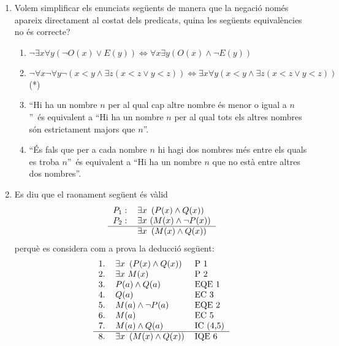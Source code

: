 \begin{enumerate}
\item Volem simplificar els enunciats seg\"{u}ents de manera que la
negaci\'{o} nom\'{e}s apareix directament al costat dels predicats, quina les
seg\"{u}ents equival\`{e}ncies no \'{e}s correcte?

\begin{enumerate}
\item $\lnot\exists x\forall y(\lnot O(x)\vee E(y))\Longleftrightarrow\forall
x\exists y(O(x)\wedge\lnot E(y))$

\item $\lnot\forall x\lnot\forall y\lnot(x<y\wedge\exists z(x<z\vee
y<z))\Longleftrightarrow\exists x\forall y(x<y\wedge\exists z(x<z\vee y<z)) $ (*)

\item \textquotedblleft Hi ha un nombre $n$ per al qual cap altre nombre
\'{e}s menor o igual a $n$\textquotedblright\ \'{e}s equivalent a
\textquotedblleft Hi ha un nombre $n$ per al qual tots els altres nombres
s\'{o}n estrictament majors que $n$\textquotedblright.

\item \textquotedblleft\'{E}s fals que per a cada nombre $n$ hi hagi dos
nombres m\'{e}s entre els quals es troba $n$\textquotedblright\ \'{e}s
equivalent a \textquotedblleft Hi ha un nombre $n$ que no est\`{a} entre
altres dos nombres\textquotedblright.
\end{enumerate}

\item Es diu que el raonament seg\"{u}ent \'{e}s v\`{a}lid%
\[%
\begin{tabular}
[c]{ll}%
$P_{1}:$ & $\exists x~\left(  P(x)\wedge Q(x)\right)  $\\
$P_{2}:$ & $\exists x$ $\left(  M(x)\wedge\lnot P(x)\right)  $\\\hline
& $\exists x~\left(  M(x)\wedge Q(x)\right)  $%
\end{tabular}
\]
perqu\`{e} es considera com a prova la deducci\'{o} seg\"{u}ent:%
\[%
\begin{tabular}
[c]{lll}%
1. & $\exists x~\left(  P(x)\wedge Q(x)\right)  $ & P 1\\
2. & $\exists x$ $M(x)$ & P 2\\
3. & $P(a)\wedge Q(a)$ & EQE 1\\
4. & $Q(a)$ & EC 3\\
5. & $M(a)\wedge\lnot P(a)$ & EQE 2\\
6. & $M(a)$ & EC 5\\
7. & $M(a)\wedge Q(a)$ & IC (4,5)\\\hline
8. & $\exists x~\left(  M(x)\wedge Q(x)\right)  $ & IQE 6
\end{tabular}
\]



\end{enumerate}
